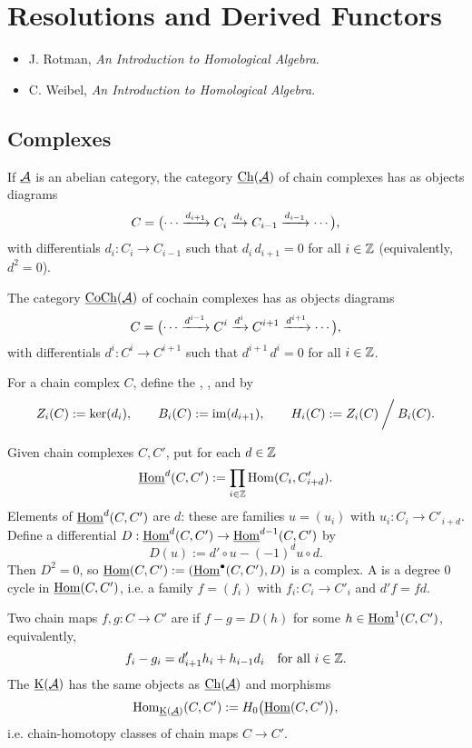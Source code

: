 
\chapter{Resolutions and Derived Functors}

\begin{itemize}
	\item J. Rotman, \textit{An Introduction to Homological Algebra}.
	\item C. Weibel, \textit{An Introduction to Homological Algebra}.
\end{itemize}

\section{Complexes}

\begin{definitions*}
	\item If \( \underline{\mathcal{A}} \) is an abelian category, the category \( \underline{\mathrm{Ch}}(\underline{\mathcal{A}}) \) of chain complexes has as objects diagrams
		\[
			C = \bigl( \dotsm \xrightarrow{d_{i+1}} C_i \xrightarrow{d_i} C_{i-1} \xrightarrow{d_{i-1}} \dotsm \bigr),
		\]
		with differentials \( d_i: C_i \to C_{i-1} \) such that \( d_i\, d_{i+1} = 0 \) for all \( i \in \mathbb{Z} \) (equivalently, \( d^2 = 0 \)).
	\item The category \( \underline{\mathrm{CoCh}}(\underline{\mathcal{A}}) \) of cochain complexes has as objects diagrams
		\[
			C = \bigl( \dotsm \xrightarrow{d^{i-1}} C^{i} \xrightarrow{d^{i}} C^{i+1} \xrightarrow{d^{i+1}} \dotsm \bigr),
		\]
		with differentials \( d^{i}: C^{i} \to C^{i+1} \) such that \( d^{i+1}\, d^{i} = 0 \) for all \( i \in \mathbb{Z} \).
	\item For a chain complex \( C \), define the , , and  by
		\[
			Z_i(C) := \ker(d_i), \qquad B_i(C) := \operatorname{im}(d_{i+1}), \qquad H_i(C) := Z_i(C) \mathbin{\bigg/} B_i(C) .
		\]
	\item Given chain complexes \( C, C' \), put for each \( d \in \mathbb{Z} \)
		\[
			\underline{\mathrm{\operatorname{Hom}}}^{d}(C, C') := \prod_{i \in \mathbb{Z}} \operatorname{Hom}(C_i, C'_{i+d}).
		\]
		Elements of \( \underline{\mathrm{\operatorname{Hom}}}^{d}(C, C') \) are  \( d \): these are families \( u = (u_i) \) with \( u_i: C_i \to C'_{i+d} \). Define a differential \( D: \underline{\mathrm{\operatorname{Hom}}}^{d}(C, C') \to \underline{\mathrm{\operatorname{Hom}}}^{d-1}(C, C') \) by
		\[
			D(u) := d' \circ u - (-1)^{d} u \circ d .
		\]
		Then \( D^2 = 0 \), so \( \underline{\mathrm{\operatorname{Hom}}}(C, C') := (\underline{\mathrm{\operatorname{Hom}}}^{\bullet}(C, C'), D) \) is a complex. A  is a degree \( 0 \) cycle in \( \underline{\mathrm{\operatorname{Hom}}}(C, C') \), i.e. a family \( f = (f_i) \) with \( f_i: C_i \to C'_i \) and \( d' f = f d \).
	\item Two chain maps \( f, g: C \to C' \) are  if \( f - g = D(h) \) for some \( h \in \underline{\mathrm{\operatorname{Hom}}}^{1}(C, C') \), equivalently,
		\[
			f_i - g_i = d'_{i+1} h_i + h_{i-1} d_i \quad \text{for all } i \in \mathbb{Z} .
		\]
		The  \( \underline{\mathrm{K}}(\underline{\mathcal{A}}) \) has the same objects as \( \underline{\mathrm{Ch}}(\underline{\mathcal{A}}) \) and morphisms
		\[
			\operatorname{Hom}_{\underline{\mathrm{K}}(\underline{\mathcal{A}})}(C, C') := H_0\bigl(\underline{\mathrm{\operatorname{Hom}}}(C, C')\bigr) ,
		\]
		i.e. chain-homotopy classes of chain maps \( C \to C' \).
\end{definitions*}

